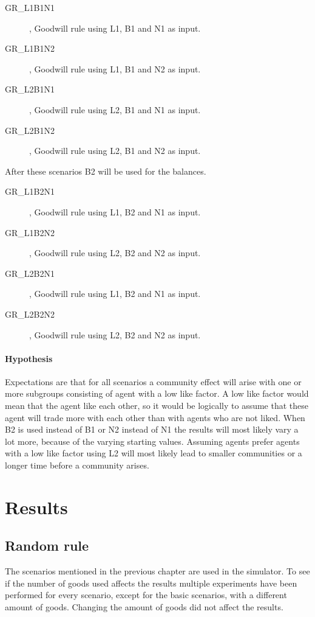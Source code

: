 \documentclass[twoside,openright]{uva-bachelor-thesis}
\begin{document}
\begin{description}
\item[GR\_L1B1N1], Goodwill rule using L1, B1 and N1 as input.
\item[GR\_L1B1N2], Goodwill rule using L1, B1 and N2 as input.
\item[GR\_L2B1N1], Goodwill rule using L2, B1 and N1 as input.
\item[GR\_L2B1N2], Goodwill rule using L2, B1 and N2 as input.
\end{description}
After these scenarios B2 will be used for the balances.
\begin{description}
\item[GR\_L1B2N1], Goodwill rule using L1, B2 and N1 as input.
\item[GR\_L1B2N2], Goodwill rule using L2, B2 and N2 as input.
\item[GR\_L2B2N1], Goodwill rule using L1, B2 and N1 as input.
\item[GR\_L2B2N2], Goodwill rule using L2, B2 and N2 as input.
\end{description}

\subsubsection{Hypothesis}
Expectations are that for all scenarios a community effect will arise with one or more subgroups consisting of agent with a low like factor. A low like factor would mean that the agent like each other, so it would be logically to assume that these agent will trade more with each other than with agents who are not liked. When B2 is used instead of B1 or N2 instead of N1 the results will most likely vary a lot more, because of the varying starting values. Assuming agents prefer agents with a low like factor using L2 will most likely lead to smaller communities or a longer time before a community arises.



\chapter{Results}

\section{Random rule}
The scenarios mentioned in the previous chapter are used in the simulator. To see if the number of goods used affects the results multiple experiments have been performed for every scenario, except for the basic scenarios, with a different amount of goods. Changing the amount of goods did not affect the results.
\end{document}
